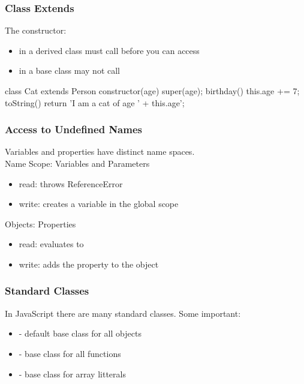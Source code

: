 \begin{frame}[fragile] \frametitle{Class Extends}
The constructor:
\begin{itemize}
  \item in a derived class must call  before you can access 
  \item in a base class may not call 
\end{itemize}
\begin{CodeBox}{}
class Cat extends Person {
  constructor(age) {
    super(age);
  }
  birthday() {
    this.age += 7;
  }
  toString() {
    return 'I am a cat of age ' + this.age';
  }
}
\end{CodeBox}
\end{frame}

\begin{frame}[fragile] \frametitle{Access to Undefined Names}
Variables and properties have distinct name spaces.
\\ \vspace{4mm}
Name Scope: Variables and Parameters
\begin{itemize}
  \item read: throws ReferenceError
  \item write: creates a variable in the global scope
\end{itemize}
\vspace{5mm}
Objects: Properties
\begin{itemize}
  \item read: evaluates to 
  \item write: adds the property to the object
\end{itemize}
\end{frame}

\begin{frame}[fragile] \frametitle{Standard Classes}
In JavaScript there are many standard classes. Some important: 
\begin{itemize}
  \item {} - default base class for all objects
  \item {} - base class for all functions
  \item {} - base class for array litterals
\end{itemize}
\end{frame}

